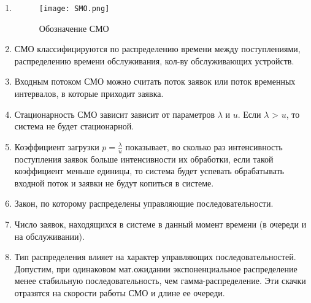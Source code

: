 \begin{enumerate}
    \item 
        \begin{figure}[H]
        \centering
        \texttt{[image: SMO.png]}
        \caption{Обозначение СМО}
        \end{figure}
    \item СМО классифицируются по распределению времени между поступлениями, распределению времени обслуживания, кол-ву обслуживающих устройств.
    \item Входным потоком СМО можно считать поток заявок или поток временных интервалов, в которые приходит заявка.
    \item Стационарность СМО зависит зависит от параметров $\lambda$ и $u$. Если $\lambda$ > $u$, то система не будет стационарной.
    \item Коэффициент загрузки $p = \frac{\lambda}{u}$ показывает, во сколько раз интенсивность поступления заявок больше интенсивности их обработки, если такой коэффициент меньше единицы, то система будет успевать обрабатывать входной поток и заявки не будут копиться в системе.
    \item Закон, по которому распределены управляющие последовательности.
    \item Число заявок, находящихся в системе в данный момент времени (в очереди и на обслуживании).
    \item Тип распределения влияет на характер управляющих последовательностей. Допустим, при одинаковом мат.ожидании экспоненциальное 
    распределение менее стабильную последовательность, чем гамма-распределение. Эти скачки отразятся на скорости работы СМО и длине ее очереди.
\end{enumerate}
   

\endinput
